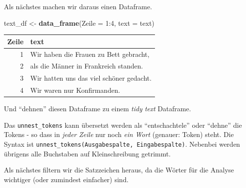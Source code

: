\documentclass[12pt,ngerman,]{book}
\makeatletter
\newenvironment{Shaded}{\begin{snugshade}}{\end{snugshade}}
\newcommand{\KeywordTok}[1]{\textcolor[rgb]{0.13,0.29,0.53}{\textbf{{#1}}}}
\newcommand{\DataTypeTok}[1]{\textcolor[rgb]{0.13,0.29,0.53}{{#1}}}
\newcommand{\DecValTok}[1]{\textcolor[rgb]{0.00,0.00,0.81}{{#1}}}
\newcommand{\StringTok}[1]{\textcolor[rgb]{0.31,0.60,0.02}{{#1}}}
\newcommand{\CommentTok}[1]{\textcolor[rgb]{0.56,0.35,0.01}{\textit{{#1}}}}
\newcommand{\NormalTok}[1]{{#1}}
\newenvironment{kframe}{%
\medskip{}
\setlength{\fboxsep}{.8em}
 \def\at@end@of@kframe{}%
 \ifinner\ifhmode%
  \def\at@end@of@kframe{\end{minipage}}%
  \begin{minipage}{\columnwidth}%
 \fi\fi%
 \def\FrameCommand##1{\hskip\@totalleftmargin \hskip-\fboxsep
 \colorbox{shadecolor}{##1}\hskip-\fboxsep
     \hskip-\linewidth \hskip-\@totalleftmargin \hskip\columnwidth}%
 \MakeFramed {\advance\hsize-\width
   \@totalleftmargin\z@ \linewidth\hsize
   \@setminipage}}%
 {\par\unskip\endMakeFramed%
 \at@end@of@kframe}
\renewenvironment{Shaded}{\begin{kframe}}{\end{kframe}}
\makeatother
\begin{document}
Als nächstes machen wir daraus einen Dataframe.

\begin{Shaded}
\begin{Highlighting}[]
\NormalTok{text_df <-}\StringTok{ }\KeywordTok{data_frame}\NormalTok{(}\DataTypeTok{Zeile =} \DecValTok{1}\NormalTok{:}\DecValTok{4}\NormalTok{,}
                      \DataTypeTok{text =} \NormalTok{text)}
\end{Highlighting}
\end{Shaded}

\begin{tabular}{r|l}
\hline
Zeile & text\\
\hline
1 & Wir haben die Frauen zu Bett gebracht,\\
\hline
2 & als die Männer in Frankreich standen.\\
\hline
3 & Wir hatten uns das viel schöner gedacht.\\
\hline
4 & Wir waren nur Konfirmanden.\\
\hline
\end{tabular}

Und ``dehnen'' diesen Dataframe zu einem \emph{tidy text} Dataframe.

\begin{Shaded}
\end{Shaded}

Das \texttt{unnest\_tokens} kann übersetzt werden als ``entschachtele''
oder ``dehne'' die Tokens - so dass in \emph{jeder Zeile} nur noch
\emph{ein Wort} (genauer: Token) steht. Die Syntax ist
\texttt{unnest\_tokens(Ausgabespalte,\ Eingabespalte)}. Nebenbei werden
übrigens alle Buchstaben auf Kleinschreibung getrimmt.

Als nächstes filtern wir die Satzzeichen heraus, da die Wörter für die
Analyse wichtiger (oder zumindest einfacher) sind.

\begin{Shaded}
\end{Shaded}
\end{document}

